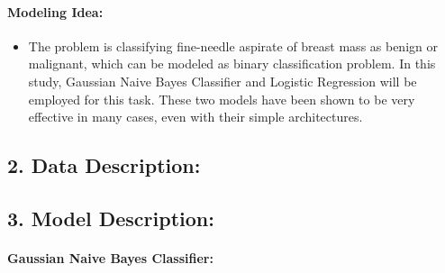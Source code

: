 \documentclass[
]{article}
\providecommand{\tightlist}{%
  \setlength{\itemsep}{0pt}\setlength{\parskip}{0pt}}
\begin{document}
\hypertarget{modeling-idea}{%
\paragraph{Modeling Idea:}\label{modeling-idea}}

\begin{itemize}
\tightlist
\item
  The problem is classifying fine-needle aspirate of breast mass as
  benign or malignant, which can be modeled as binary classification
  problem. In this study, Gaussian Naive Bayes Classifier and Logistic
  Regression will be employed for this task. These two models have been
  shown to be very effective in many cases, even with their simple
  architectures.
\end{itemize}

\hypertarget{data-description}{%
\subsection{2. Data Description:}\label{data-description}}

\hypertarget{model-description}{%
\subsection{3. Model Description:}\label{model-description}}

\hypertarget{gaussian-naive-bayes-classifier}{%
\paragraph{Gaussian Naive Bayes
Classifier:}\label{gaussian-naive-bayes-classifier}}
\end{document}
